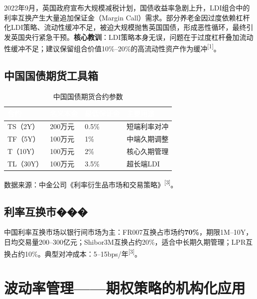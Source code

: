 \documentclass[10pt,a4paper,twocolumn]{ctexart}
\begin{document}
\begin{infobox}
\scriptsize
2022年9月，英国政府宣布大规模减税计划，国债收益率急剧上升，LDI组合中的利率互换产生大量追加保证金（Margin Call）需求。部分养老金因过度依赖杠杆化LDI策略、流动性缓冲不足，被迫大规模抛售英国国债，形成恶性循环，最终引发英国央行紧急干预。\textbf{核心教训}：LDI策略本身无误，问题在于过度杠杆叠加流动性缓冲不足；建议保留组合价值10\%--20\%的高流动性资产作为缓冲\textsuperscript{[1]}。
\end{infobox}

\subsection{中国国债期货工具箱}

\begin{table}[H]
\centering\scriptsize
\caption{中国国债期货合约参数}
\label{tab:futures}
\renewcommand{\arraystretch}{1.25}
\setlength{\tabcolsep}{3pt}
\begin{tabularx}{\columnwidth}{@{}C{0.9cm}C{1.1cm}C{1.1cm}X@{}}
\toprule
{}
\textcolor{white}{\textbf{合约}} &
\textcolor{white}{\textbf{名义本金}} &
\textcolor{white}{\textbf{最低保证金}} &
\textcolor{white}{\textbf{主要用途}} \\
\midrule
TS（2Y）& 200万元 & 0.5\% & 短端利率对冲 \\
TF（5Y）& 100万元 & 1\%   & 中端久期调整 \\
T（10Y）& 100万元 & 2\%   & 核心久期管理 \\
TL（30Y）& 100万元 & 3.5\% & 超长端LDI \\
\bottomrule
\end{tabularx}
\end{table}

{\scriptsize 数据来源：中金公司《利率衍生品市场和交易策略》\textsuperscript{[3]}。}

\subsection{利率互换市���}

中国利率互换市场以银行间市场为主：FR007互换占市场约\textbf{70\%}，期限1M--10Y，日均交易量200--300亿元；Shibor3M互换占约20\%，适合中长期久期管理；LPR互换占约10\%。典型对冲成本：5--15bps/年\textsuperscript{[3]}。


\section{波动率管理——期权策略的机构化应用}
\end{document}
